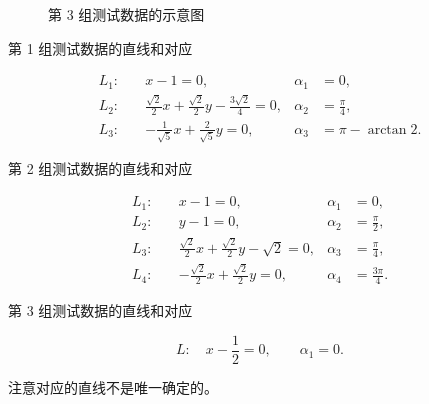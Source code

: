 \begin{figure}[h]
\begin{minipage}[t]{0.34\linewidth}
\begin{tikzpicture}[
			scale=0.72,
			>=Stealth,
			every node/.style={font=\scriptsize}
		]
		\end{tikzpicture}

		\vspace{1mm}

		第 3 组测试数据的示意图
	\end{minipage}

\end{figure}

第 1 组测试数据的直线和对应

\[
\begin{aligned}
L_1:\quad &x-1=0,
&\alpha_1&=0,\\
L_2:\quad &\frac{\sqrt{2}}{2}x+\frac{\sqrt{2}}{2}y-\frac{3\sqrt{2}}{4}=0,
&\alpha_2&=\frac{\pi}{4},\\
L_3:\quad &-\frac{1}{\sqrt{5}}x+\frac{2}{\sqrt{5}}y=0,
&\alpha_3&=\pi-\arctan 2.
\end{aligned}
\]



第 2 组测试数据的直线和对应

\[
\begin{aligned}
L_1:\quad &x-1=0,
&\alpha_1&=0,\\
L_2:\quad &y-1=0,
&\alpha_2&=\frac{\pi}{2},\\
L_3:\quad &\frac{\sqrt{2}}{2}x+\frac{\sqrt{2}}{2}y-\sqrt{2}=0,
&\alpha_3&=\frac{\pi}{4},\\
L_4:\quad &-\frac{\sqrt{2}}{2}x+\frac{\sqrt{2}}{2}y=0,
&\alpha_4&=\frac{3\pi}{4}.
\end{aligned}
\]

第 3 组测试数据的直线和对应

\[
L:\quad x-\frac{1}{2}=0,
\qquad
\alpha_1=0.
\]

注意对应的直线不是唯一确定的。
